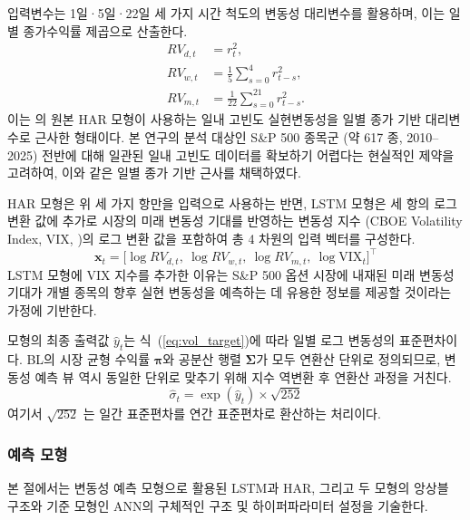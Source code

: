 \documentclass{article}
\begin{document}
입력변수는 1일·5일·22일 세 가지 시간 척도의 변동성 대리변수를 활용하며, 이는 일별 종가수익률 제곱으로 산출한다.
\begin{align}
RV_{d,t} &= r_t^2,\\
RV_{w,t} &= \frac{1}{5}\sum_{s=0}^{4} r_{t-s}^2,\\
RV_{m,t} &= \frac{1}{22}\sum_{s=0}^{21} r_{t-s}^2.
\end{align}
이는 \citet{corsi2009}의 원본 HAR 모형이 사용하는 일내 고빈도 실현변동성을 일별 종가 기반 대리변수로 근사한 형태이다. 본 연구의 분석 대상인 S\&P 500 종목군 (약 617 종, 2010--2025) 전반에 대해 일관된 일내 고빈도 데이터를 확보하기 어렵다는 현실적인 제약을 고려하여, 이와 같은 일별 종가 기반 근사를 채택하였다.

HAR 모형은 위 세 가지 항만을 입력으로 사용하는 반면, LSTM 모형은 세 항의 로그 변환 값에 추가로 시장의 미래 변동성 기대를 반영하는 변동성 지수 (CBOE Volatility Index, VIX, \citealp{whaley2009understanding})의 로그 변환 값을 포함하여 총 4 차원의 입력 벡터를 구성한다.
\begin{equation}
\mathbf{x}_t = \bigl[\log RV_{d,t},\ \log RV_{w,t},\ \log RV_{m,t},\
\log \text{VIX}_t\bigr]^\top
\label{eq:vol_input}
\end{equation}
LSTM 모형에 VIX 지수를 추가한 이유는 S\&P 500 옵션 시장에 내재된 미래 변동성 기대가 개별 종목의 향후 실현 변동성을 예측하는 데 유용한 정보를 제공할 것이라는 가정에 기반한다.

모형의 최종 출력값 $\hat{y}_t$는 식~(\ref{eq:vol_target})에 따라 일별 로그 변동성의 표준편차이다. BL의 시장 균형 수익률 $\boldsymbol{\pi}$와 공분산 행렬 $\boldsymbol{\Sigma}$가 모두 연환산 단위로 정의되므로, 변동성 예측 뷰 역시 동일한 단위로 맞추기 위해 지수 역변환 후 연환산 과정을 거친다.
\begin{equation}
\hat{\sigma}_t = \exp(\hat{y}_t) \times \sqrt{252}
\label{eq:bl_input}
\end{equation}
여기서 $\sqrt{252}$ 는 일간 표준편차를 연간 표준편차로 환산하는 처리이다.

\subsubsection{예측 모형}

본 절에서는 변동성 예측 모형으로 활용된 LSTM과 HAR, 그리고 두 모형의 앙상블 구조와 기준 모형인 ANN의 구체적인 구조 및 하이퍼파라미터 설정을 기술한다.
\end{document}
